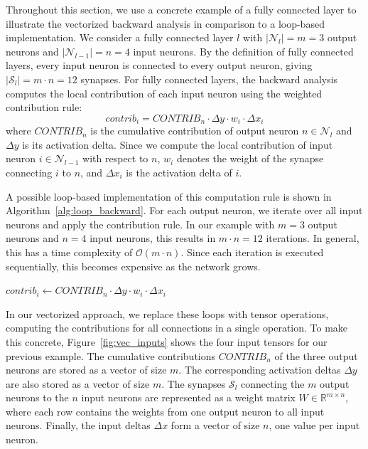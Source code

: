 \documentclass[
12pt,
fancyheadings,
a4paper,
twoside,
BCOR=0.7cm,
nobcorignoretitle,
grayscalebody,
]{stsreprt}
\begin{document}
Throughout this section, we use a concrete example of a fully connected layer to illustrate the
vectorized backward analysis in comparison to a loop-based implementation.
We consider a fully connected layer $l$ with $|\mathcal{N}_l| = m = 3$ output neurons and
$|\mathcal{N}_{l-1}| = n = 4$ input neurons.
By the definition of fully connected layers, every input neuron is connected to every output
neuron, giving $|\mathcal{S}_l| = m \cdot n = 12$ synapses.
For fully connected layers, the backward analysis computes the local contribution of each input
neuron using the weighted contribution rule:
\begin{equation}
    \textit{contrib}_i = \textit{CONTRIB}_n \cdot \Delta y \cdot w_i \cdot \Delta x_i
\end{equation}
where $\textit{CONTRIB}_n$ is the cumulative contribution of output neuron $n \in \mathcal{N}_l$
and $\Delta y$ is its activation delta.
Since we compute the local contribution of input neuron $i \in \mathcal{N}_{l-1}$ with respect to
$n$, $w_i$ denotes the weight of the synapse connecting $i$ to $n$, and $\Delta x_i$ is the
activation delta of $i$.

A possible loop-based implementation of this computation rule is shown in
Algorithm~\ref{alg:loop_backward}.
For each output neuron, we iterate over all input neurons and apply the contribution rule.
In our example with $m = 3$ output neurons and $n = 4$ input neurons, this results in $m \cdot n =
12$ iterations.
In general, this has a time complexity of $\mathcal{O}(m \cdot n)$. Since each iteration is
executed sequentially, this becomes expensive as the network grows.

\begin{algorithm}[ht]
\caption{Loop-based backward contribution for a fully connected layer}\label{alg:loop_backward}
\begin{algorithmic}[1]
            \State $\textit{contrib}_i \gets \textit{CONTRIB}_n \cdot \Delta y \cdot w_i \cdot \Delta x_i$
        \EndFor
    \EndIf
\EndFor
\end{algorithmic}
\end{algorithm}

In our vectorized approach, we replace these loops with tensor operations, computing the
contributions for all connections in a single operation.
To make this concrete, Figure~\ref{fig:vec_inputs} shows the four input tensors for our previous
example.
The cumulative contributions $\textit{CONTRIB}_n$ of the three output neurons are stored as a
vector of size $m$.
The corresponding activation deltas $\Delta y$ are also stored as a vector of size $m$.
The synapses $\mathcal{S}_l$ connecting the $m$ output neurons to the $n$ input neurons are
represented as a weight matrix $W \in \mathbb{R}^{m \times n}$, where each row contains the weights
from one output neuron to all input neurons.
Finally, the input deltas $\Delta x$ form a vector of size $n$, one value per input neuron.
\end{document}
